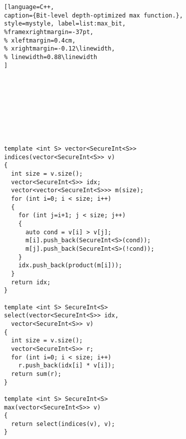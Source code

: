\begin{figure}[t]
\begin{minipage}{\linewidth}
\begin{lstlisting}[language=C++,
caption={Bit-level depth-optimized max function.},
style=mystyle, label=list:max_bit,
%framexrightmargin=-37pt,
% xleftmargin=0.4cm,
% xrightmargin=-0.12\linewidth,
% linewidth=0.88\linewidth
]









template <int S> vector<SecureInt<S>>
indices(vector<SecureInt<S>> v)
{
  int size = v.size();
  vector<SecureInt<S>> idx;
  vector<vector<SecureInt<S>>> m(size);
  for (int i=0; i < size; i++)
  {
    for (int j=i+1; j < size; j++)
    {
      auto cond = v[i] > v[j];
      m[i].push_back(SecureInt<S>(cond));
      m[j].push_back(SecureInt<S>(!cond));
    }
    idx.push_back(product(m[i]));
  }
  return idx;
}

template <int S> SecureInt<S>
select(vector<SecureInt<S>> idx,
  vector<SecureInt<S>> v)
{
  int size = v.size();
  vector<SecureInt<S>> r;
  for (int i=0; i < size; i++)
    r.push_back(idx[i] * v[i]);
  return sum(r);
}

template <int S> SecureInt<S>
max(vector<SecureInt<S>> v)
{
  return select(indices(v), v);
}

\end{lstlisting}
\end{minipage}
\end{figure}
